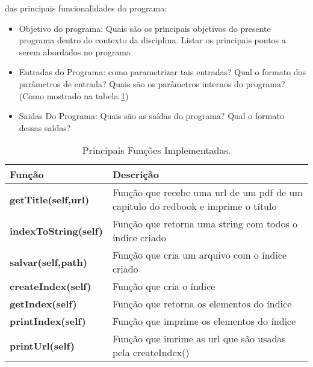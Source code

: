 ﻿%



%
%

 das principais funcionalidades do programa:

\begin{itemize}
	\item Objetivo do programa: Quais são os principais objetivos do presente programa dentro do contexto da disciplina. Listar os principais pontos a serem abordados no programa
	\item Entradas do Programa: como parametrizar tais entradas? Qual o formato dos parâmetros de entrada? Quais são os parâmetros internos do programa?(Como mostrado na tabela \ref{tabela:FuncoesProg})
	\item Saidas Do Programa: Quais são as saídas do programa? Qual o formato dessas saídas?
\end{itemize}

 \begin{table}[h]
\begin{center}
\caption{Principais Funções Implementadas.}
\label{tabela:FuncoesProg}
\begin{tabular}{l p{5cm}}  %
Função & Descrição\\ \hline\hline
\textbf{getTitle(self,url)} & Função que recebe uma url de um pdf de um capítulo do redbook e imprime o título   \\ \hline
\textbf{indexToString(self)} & Função que retorna uma string com todos o índice criado  \\ \hline
\textbf{salvar(self,path)} & Função que cria um arquivo com o índice criado  \\ \hline
\textbf{createIndex(self)} & Função que cria o índice  \\ \hline
\textbf{getIndex(self)} & Função que retorna os elementos do índice  \\ \hline
\textbf{printIndex(self)} & Função que imprime os elementos do índice  \\ \hline
\textbf{printUrl(self)} & Função que imrime as url que são usadas pela createIndex()  \\ \hline
\end{tabular}
\end{center}
\end{table}
